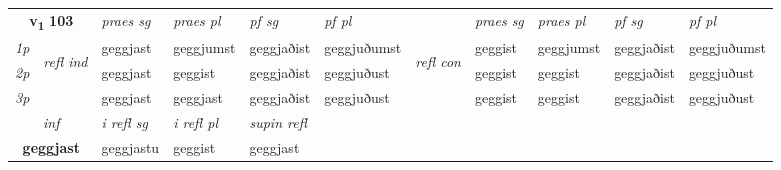 \noindent
\begin{tabular}{lllllllllll} \toprule
\multicolumn{2}{c}{\textbf{v{\textsubscript{1}}} \Large{\textbf{103}}}  &  \textit{praes sg}  & \textit{praes pl}  &\textit{ pf sg} & \textit{pf pl} &  &  \textit{praes sg}  & \textit{praes pl}  & \textit{pf sg} & \textit{pf pl } \\*
	\cmidrule{3-6} \cmidrule{8-11}
 {\textit{1p}} & \multirow{3}{*}{\begin{turn}{90}\textit{refl ind}\end{turn}}  & geggjast & geggjumst & geggjaðist & geggjuðumst & \multirow{3}{*}{\begin{turn}{90}\textit{refl con}\end{turn}}  &geggist & geggjumst & geggjaðist & geggjuðumst \\*
 {\textit{2p}} &  & geggjast & geggist & geggjaðist & geggjuðust & &geggist & geggist & geggjaðist & geggjuðust \\*
 {\textit{3p}}  & & geggjast & geggjast & geggjaðist & geggjuðust & & geggist & geggist& geggjaðist & geggjuðust \\*
\cmidrule{3-6} \cmidrule{8-11}

   \multicolumn{2}{c}{\textit{inf}}   & \textit{i refl sg} & \textit{i refl pl}   & \textit{supin refl}  \\*
  \multicolumn{2}{c}{\textbf{geggjast}}    & geggjastu & geggist   & geggjast  \\*
\end{tabular}

